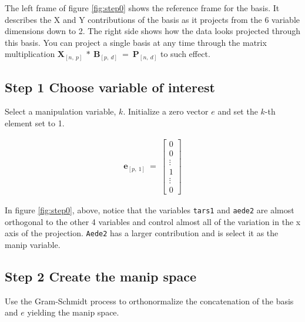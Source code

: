 \documentclass{monashthesis}
\begin{document}
The left frame of figure \ref{fig:step0} shows the reference frame for
the basis. It describes the X and Y contributions of the basis as it
projects from the 6 variable dimensions down to 2. The right side shows
how the data looks projected through this basis. You can project a
single basis at any time through the matrix multiplication
\(\textbf{X}_{[n,~p]} ~*~ \textbf{B}_{[p,~d]} ~=~ \textbf{P}_{[n,~d]}\)
to such effect.

\subsection{Step 1 Choose variable of
interest}\label{step-1-choose-variable-of-interest}

Select a manipulation variable, \(k\). Initialize a zero vector \(e\)
and set the \(k\)-th element set to 1.

\begin{align*}
\textbf{e}_{[p,~1]} ~=~
  \begin{bmatrix}
    0 \\
    0 \\
    \vdots \\
    1 \\
    \vdots \\
    0
  \end{bmatrix}
\end{align*}

In figure \ref{fig:step0}, above, notice that the variables
\texttt{tars1} and \texttt{aede2} are almost orthogonal to the other 4
variables and control almost all of the variation in the x axis of the
projection. \texttt{Aede2} has a larger contribution and is select it as
the manip variable.

\subsection{Step 2 Create the manip
space}\label{step-2-create-the-manip-space}

Use the Gram-Schmidt process to orthonormalize the concatenation of the
basis and \(e\) yielding the manip space.
\end{document}
